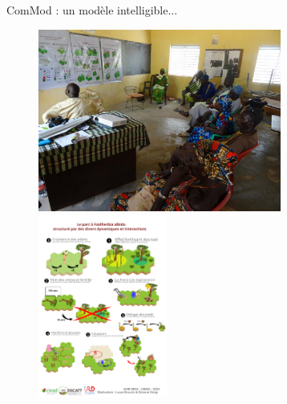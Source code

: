 \documentclass[aspectratio=169]{beamer}
\begin{document}
\begin{frame}{ComMod : un modèle intelligible...}
    \begin{center}
        \vspace{-1em}
        \begin{figure}
            \centering
            \includegraphics[height = 6cm]{img/atelierPoster.jpg}~
            \includegraphics[height = 6cm]{img/poster2.png}
        \end{figure}
    \end{center}
\end{frame}
\end{document}
